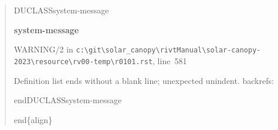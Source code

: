 \documentclass[12pt,notitle,letterpaper]{report}
\newenvironment{DUclass}[1]%
  {%
   \def\DocutilsClassFunctionName{DUCLASS#1}
     \csname \DocutilsClassFunctionName \endcsname}%
  {\csname end\DocutilsClassFunctionName \endcsname}%
\newenvironment{DUadmonition}%
  {\begin{center}
     \begin{lrbox}{\DUadmonitionbox}
       \begin{minipage}{0.9\linewidth}
  }%
  {    \end{minipage}
     \end{lrbox}
     \fbox{\usebox{\DUadmonitionbox}}
   \end{center}
  }
\providecommand*{\DUtitle}[1]{%
  \smallskip\noindent\textbf{#1}\smallskip}
\begin{document}
\begin{quote}
\begin{description}
\end{description}

\begin{DUclass}{system-message}
\begin{DUadmonition}
\DUtitle{system-message
}

{\color{red}WARNING/2} in \texttt{c:\textbackslash{}git\textbackslash{}solar\_canopy\textbackslash{}rivtManual\textbackslash{}solar-canopy-2023\textbackslash{}resource\textbackslash{}rv00-temp\textbackslash{}r0101.rst}, line~581

Definition list ends without a blank line; unexpected unindent.
backrefs: \end{DUadmonition}
\end{DUclass}

end\{align\}
\end{quote}
\end{document}

